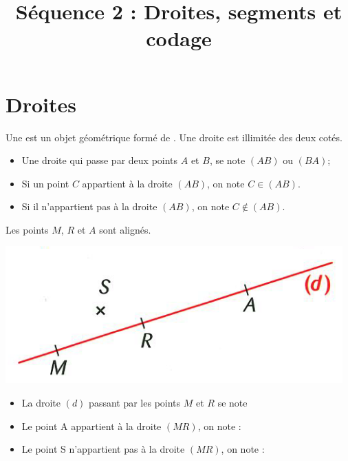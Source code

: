 \documentclass[xcolor={dvipsnames}]{beamer}
\title{Séquence 2 : Droites, segments et codage}
\begin{document}
\begin{frame}
  \titlepage 
\end{frame}


\begin{frame}{}
	
\end{frame}

\section{Droites}




\begin{frame}{}

	\begin{mydef}
		Une  est un objet géométrique formé de . Une droite est illimitée des deux cotés.\pause
	\end{mydef}
	
	\begin{myprops}
		\begin{itemize}
			\item Une droite qui passe par deux points $A$ et $B$, se note $(AB)$ ou $(BA)$;
			\item Si un point $C$ appartient à la droite $(AB)$, on note $C \in (AB)$.
			\item Si il n'appartient pas à la droite $(AB)$, on note $C \notin (AB)$.\pause
		\end{itemize}
	\end{myprops}
	
	\begin{myex}
		Les points $M$, $R$ et $A$ sont alignés.
		\begin{center}
			\includegraphics[scale=0.15]{../img/droite1}
		\end{center}
		
		\begin{itemize}
			\item La droite $(d)$ passant par les points $M$ et $R$ se note 
			\item Le point A appartient à la droite $(MR)$, on note :
			\item Le point S n'appartient pas à la droite $(MR)$, on note :
		\end{itemize}
	\end{myex}
\end{frame}
\end{document}

